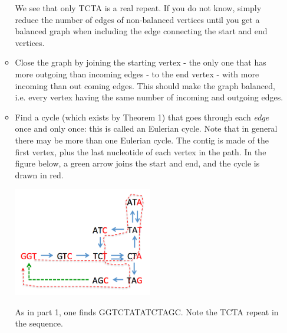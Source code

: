 \documentclass[a4paper,11pt]{article}
\begin{document}
\begin{enumerate}
\begin{itemize}
		        We see that only TCTA is a real repeat. If you do not know, simply reduce the number of edges of non-balanced vertices until you get a balanced graph when including the edge connecting the start and end vertices. 
	\item Close the graph by joining the starting vertex - the only one that has more outgoing than incoming edges - to the end vertex - with more incoming than out coming edges. This should make the graph balanced, i.e. every vertex having the same number of incoming and outgoing edges.
	\item Find a cycle (which exists by Theorem 1) that goes through each \textit{edge} once and only once: this is called an Eulerian cycle. Note that in general there may be more than one Eulerian cycle. The contig is made of the first vertex, plus the last nucleotide of each vertex in the path.  In the figure below, a green arrow joins the start and end, and the cycle is drawn in red.
		\begin{center}
		\includegraphics[width=0.5\textwidth]{eulerian.png}\\
		\end{center}
		As in part 1, one finds GGTCTATATCTAGC. Note the TCTA repeat in the sequence.
	\end{itemize}

\end{enumerate}
\end{document}
